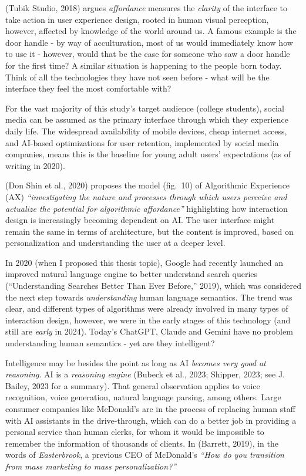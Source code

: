 \documentclass[
  12pt,
  letterpaper,
  DIV=11,
  numbers=noendperiod]{scrartcl}
\begin{document}
(Tubik Studio, 2018) argues \emph{affordance} measures the
\emph{clarity} of the interface to take action in user experience
design, rooted in human visual perception, however, affected by
knowledge of the world around us. A famous example is the door handle -
by way of acculturation, most of us would immediately know how to use it
- however, would that be the case for someone who saw a door handle for
the first time? A similar situation is happening to the people born
today. Think of all the technologies they have not seen before - what
will be the interface they feel the most comfortable with?

For the vast majority of this study's target audience (college
students), social media can be assumed as the primary interface through
which they experience daily life. The widespread availability of mobile
devices, cheap internet access, and AI-based optimizations for user
retention, implemented by social media companies, means this is the
baseline for young adult users' expectations (as of writing in 2020).

(Don Shin et al., 2020) proposes the model (fig.~10) of Algorithmic
Experience (AX) \emph{``investigating the nature and processes through
which users perceive and actualize the potential for algorithmic
affordance''} highlighting how interaction design is increasingly
becoming dependent on AI. The user interface might remain the same in
terms of architecture, but the content is improved, based on
personalization and understanding the user at a deeper level.

In 2020 (when I proposed this thesis topic), Google had recently
launched an improved natural language engine to better understand search
queries ({``Understanding Searches Better Than Ever Before,''} 2019),
which was considered the next step towards \emph{understanding} human
language semantics. The trend was clear, and different types of
algorithms were already involved in many types of interaction design,
however, we were in the early stages of this technology (and still are
\emph{early} in 2024). Today's ChatGPT, Claude and Gemini have no
problem understanding human semantics - yet are they intelligent?

Intelligence may be besides the point as long as AI \emph{becomes very
good at reasoning}. AI is a \emph{reasoning engine} (Bubeck et al.,
2023; Shipper, 2023; see J. Bailey, 2023 for a summary). That general
observation applies to voice recognition, voice generation, natural
language parsing, among others. Large consumer companies like McDonald's
are in the process of replacing human staff with AI assistants in the
drive-through, which can do a better job in providing a personal service
than human clerks, for whom it would be impossible to remember the
information of thousands of clients. In (Barrett, 2019), in the words of
\emph{Easterbrook}, a previous CEO of McDonald's \emph{``How do you
transition from mass marketing to mass personalization?''}
\end{document}

